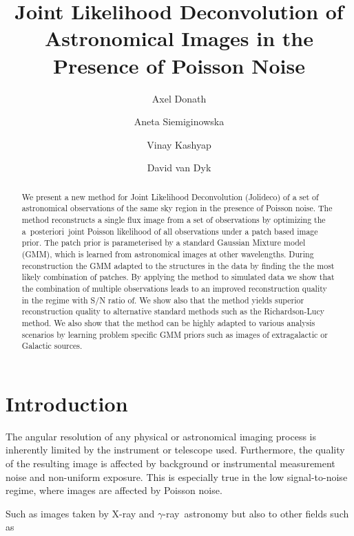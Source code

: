 \documentclass[twocolumn]{aastex631}
\newcommand{\aposteriori}{a~posteriori~}
\newcommand{\gammaray}{$\gamma$-ray\xspace}
\newcommand{\xray}{X-ray\xspace}
\begin{document}
    \title{Joint Likelihood Deconvolution of Astronomical Images in the Presence of Poisson Noise}

    \author[0000-0003-4568-7005]{Axel Donath}
    \author[0000-0002-0905-7375]{Aneta Siemiginowska}
    \author[0000-0002-3869-7996]{Vinay Kashyap}
    \author[0000-0000-0000-0000]{David van Dyk}


    \begin{abstract}
        We present a new method for Joint Likelihood Deconvolution (Jolideco) of a set of astronomical observations of the same sky region in the presence of Poisson noise.
        The method reconstructs a single flux image from a set of observations
        by optimizing the \aposteriori joint Poisson likelihood of all
        observations under a patch based image prior. The patch
        prior is parameterised by a standard Gaussian Mixture model (GMM), which is
        learned from astronomical images at other wavelengths.
        During reconstruction the GMM adapted to the structures
        in the data by finding the the most likely combination of 
        patches. 
        By applying the method to simulated data we show that
        the combination of multiple observations leads to an
        improved reconstruction quality in the regime with S/N ratio of.
        We show also that the method yields superior reconstruction quality
        to alternative standard methods such as the Richardson-Lucy method.
        We also show that the method can be highly adapted to various 
        analysis scenarios by learning problem specific GMM priors
        such as images of extragalactic or Galactic sources.
    \end{abstract}



    \section{Introduction}
    The angular resolution of any physical or astronomical imaging process is inherently limited by the instrument or telescope used. Furthermore, the quality of the resulting image is affected by background or instrumental measurement noise and non-uniform exposure. This is especially true in the low signal-to-noise regime, where images are affected by Poisson noise.
    
    Such as images taken by \xray and \gammaray~astronomy but also to other fields such as 
\end{document}

